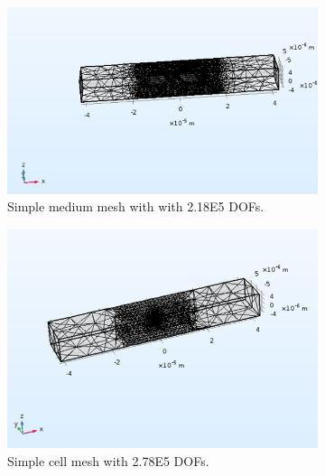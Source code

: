 \clearpage
\begin{figure}[h]
    \centering
    \begin{subfigure}[b]{0.4\textwidth}
        \centering
        \includegraphics[width=\textwidth]{images/simpleMediumMesh.png}
        \caption{Simple medium mesh with with 2.18E5 DOFs.}
        \label{fig:simple_medium_mesh}
    \end{subfigure}
    \hfill
    \begin{subfigure}[b]{0.4\textwidth}
        \centering
        \includegraphics[width=\textwidth]{images/simpleCellMesh.png}
        \caption{Simple cell mesh with 2.78E5 DOFs.}
        \label{fig:simple_cell_mesh}
    \end{subfigure}
    \\ \vspace{0.3 in}
    \begin{subfigure}[b]{0.4\textwidth}
        \centering

\end{subfigure}
\end{figure}

